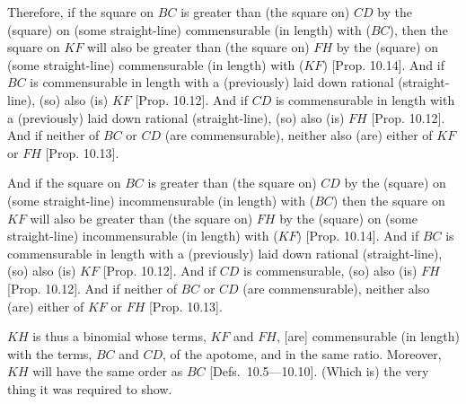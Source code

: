 \begin{Parallel}{}{}
{Therefore,  if the square on $BC$ is greater than (the square on) $CD$
by the (square) on (some straight-line) commensurable (in length) with ($BC$), 
then the square on $KF$ will also be greater than (the square on) $FH$
by the (square) on (some straight-line) commensurable (in length) with ($KF$) [Prop. 10.14]. And if $BC$ is commensurable
in length with a (previously) laid down rational (straight-line), (so) also (is) $KF$
[Prop. 10.12].
And if $CD$ is commensurable in length with a (previously) laid
down rational (straight-line), (so) also  (is) $FH$ [Prop. 10.12]. And if neither of $BC$ or $CD$
(are commensurable), neither also (are) either of $KF$ or $FH$ [Prop. 10.13].

And if the square on $BC$ is greater than (the square on) $CD$
by the (square) on (some straight-line) incommensurable (in length) with ($BC$) then
the square on $KF$ will also be greater than (the square on) $FH$
by the (square) on (some straight-line) incommensurable (in length) with ($KF$) [Prop. 10.14]. And if $BC$ is commensurable
in length with a (previously) laid down rational (straight-line), (so) also (is) $KF$
[Prop. 10.12].
And if $CD$ is commensurable, (so) also (is) $FH$ [Prop. 10.12]. And if neither of $BC$ or $CD$
(are commensurable), neither also (are) either of $KF$ or $FH$ [Prop. 10.13].

$KH$ is thus a binomial whose terms, $KF$ and $FH$, [are] commensurable
(in length) with the terms, $BC$ and $CD$,  of the apotome, and in the same ratio. 
Moreover, $KH$ will have the same order as $BC$ [Defs.~10.5---10.10]. 
  (Which is) the very thing it was required to show.}
\end{Parallel}

